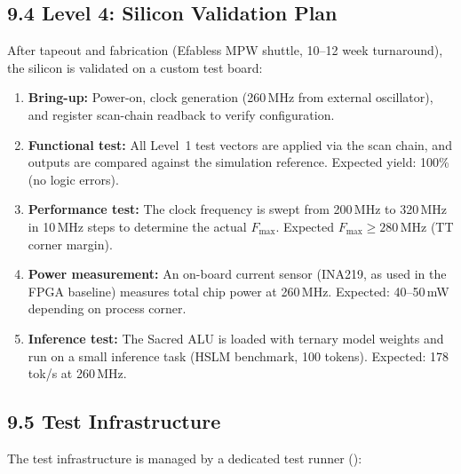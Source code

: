 \subsection{9.4 Level 4: Silicon Validation Plan}

After tapeout and fabrication (Efabless MPW shuttle, 10--12 week
turnaround), the silicon is validated on a custom test board:

\begin{enumerate}
\tightlist
\item \textbf{Bring-up:} Power-on, clock generation (260\,MHz from
      external oscillator), and register scan-chain readback to verify
      configuration.
\item \textbf{Functional test:} All Level~1 test vectors are applied
      via the scan chain, and outputs are compared against the
      simulation reference. Expected yield: 100\% (no logic errors).
\item \textbf{Performance test:} The clock frequency is swept from
      200\,MHz to 320\,MHz in 10\,MHz steps to determine the actual
      \(F_{\max}\). Expected \(F_{\max} \geq 280\,\text{MHz}\)
      (TT corner margin).
\item \textbf{Power measurement:} An on-board current sensor (INA219,
      as used in the FPGA baseline) measures total chip power at
      260\,MHz. Expected: 40--50\,mW depending on process corner.
\item \textbf{Inference test:} The Sacred ALU is loaded with ternary
      model weights and run on a small inference task (HSLM benchmark,
      100 tokens). Expected: 178\,tok/s at 260\,MHz.
\end{enumerate}

\subsection{9.5 Test Infrastructure}

The test infrastructure is managed by a dedicated test runner
():

